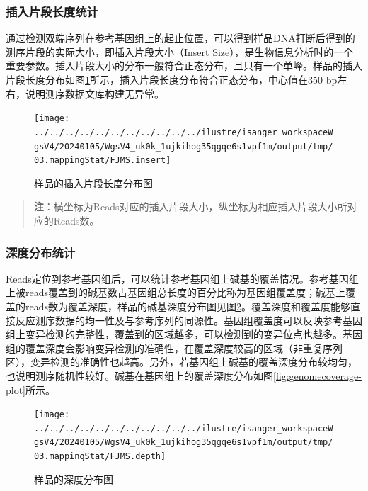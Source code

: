 \documentclass[
  a4paper,
  titlepage]{article}
\begin{document}
\hypertarget{ux63d2ux5165ux7247ux6bb5ux957fux5ea6ux7edfux8ba1}{%
\subsubsection{插入片段长度统计}\label{ux63d2ux5165ux7247ux6bb5ux957fux5ea6ux7edfux8ba1}}

通过检测双端序列在参考基因组上的起止位置，可以得到样品DNA打断后得到的测序片段的实际大小，即插入片段大小（Insert Size），是生物信息分析时的一个重要参数。插入片段大小的分布一般符合正态分布，且只有一个单峰。样品的插入片段长度分布如图\ref{fig:insertsize-plot}所示，插入片段长度分布符合正态分布，中心值在350 bp左右，说明测序数据文库构建无异常。

\begin{figure}[H]

{\centering \texttt{[image: ../../../../../../../../../../../ilustre/isanger\_workspaceWgsV4/20240105/WgsV4\_uk0k\_1ujkihog35qgqe6s1vpf1m/output/tmp/03.mappingStat/FJMS.insert]} 

}

\caption{样品的插入片段长度分布图}\label{fig:insertsize-plot}
\end{figure}

\begin{quote}
\textbf{注}：横坐标为Reads对应的插入片段大小，纵坐标为相应插入片段大小所对应的Reads数。
\end{quote}

\hypertarget{ux6df1ux5ea6ux5206ux5e03ux7edfux8ba1}{%
\subsubsection{深度分布统计}\label{ux6df1ux5ea6ux5206ux5e03ux7edfux8ba1}}

Reads定位到参考基因组后，可以统计参考基因组上碱基的覆盖情况。参考基因组上被reads覆盖到的碱基数占基因组总长度的百分比称为基因组覆盖度；碱基上覆盖的reads数为覆盖深度，样品的碱基深度分布图见图\ref{fig:basedepth-plot}。覆盖深度和覆盖度能够直接反应测序数据的均一性及与参考序列的同源性。基因组覆盖度可以反映参考基因组上变异检测的完整性，覆盖到的区域越多，可以检测到的变异位点也越多。基因组的覆盖深度会影响变异检测的准确性，在覆盖深度较高的区域（非重复序列区），变异检测的准确性也越高。另外，若基因组上碱基的覆盖深度分布较均匀，也说明测序随机性较好。碱基在基因组上的覆盖深度分布如图\ref{fig:genomecoverage-plot}所示。

\begin{figure}[H]

{\centering \texttt{[image: ../../../../../../../../../../../ilustre/isanger\_workspaceWgsV4/20240105/WgsV4\_uk0k\_1ujkihog35qgqe6s1vpf1m/output/tmp/03.mappingStat/FJMS.depth]} 

}

\caption{样品的深度分布图}\label{fig:basedepth-plot}
\end{figure}
\end{document}
